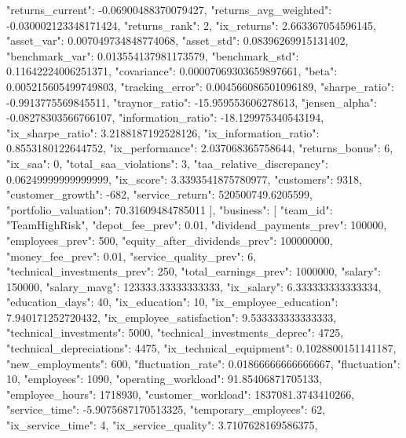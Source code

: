 {{            "returns_current": -0.06900488370079427,
            "returns_avg_weighted": -0.030002123348171424,
            "returns_rank": 2,
            "ix_returns": 2.663367054596145,
            "asset_var": 0.007049734848774068,
            "asset_std": 0.08396269915131402,
            "benchmark_var": 0.013554137981173579,
            "benchmark_std": 0.11642224006251371,
            "covariance": 0.00007069303659897661,
            "beta": 0.005215605499749803,
            "tracking_error": 0.004566086501096189,
            "sharpe_ratio": -0.9913775569845511,
            "traynor_ratio": -15.959553606278613,
            "jensen_alpha": -0.08278303566766107,
            "information_ratio": -18.129975340543194,
            "ix_sharpe_ratio": 3.2188187192528126,
            "ix_information_ratio": 0.8553180122644752,
            "ix_performance": 2.037068365758644,
            "returns_bonus": 6,
            "ix_saa": 0,
            "total_saa_violations": 3,
            "taa_relative_discrepancy": 0.06249999999999999,
            "ix_score": 3.3393541875780977,
            "customers": 9318,
            "customer_growth": -682,
            "service_return": 520500749.6205599,
            "portfolio_valuation": 70.31609484785011
        }
    ],
    "business": [
        {
            "team_id": "TeamHighRisk",
            "depot_fee_prev": 0.01,
            "dividend_payments_prev": 100000,
            "employees_prev": 500,
            "equity_after_dividends_prev": 100000000,
            "money_fee_prev": 0.01,
            "service_quality_prev": 6,
            "technical_investments_prev": 250,
            "total_earnings_prev": 1000000,
            "salary": 150000,
            "salary_mavg": 123333.33333333333,
            "ix_salary": 6.333333333333334,
            "education_days": 40,
            "ix_education": 10,
            "ix_employee_education": 7.940171252720432,
            "ix_employee_satisfaction": 9.533333333333333,
            "technical_investments": 5000,
            "technical_investments_deprec": 4725,
            "technical_depreciations": 4475,
            "ix_technical_equipment": 0.1028800151141187,
            "new_employments": 600,
            "fluctuation_rate": 0.01866666666666667,
            "fluctuation": 10,
            "employees": 1090,
            "operating_workload": 91.85406871705133,
            "employee_hours": 1718930,
            "customer_workload": 1837081.3743410266,
            "service_time": -5.9075687170513325,
            "temporary_employees": 62,
            "ix_service_time": 4,
            "ix_service_quality": 3.7107628169586375,
}}
